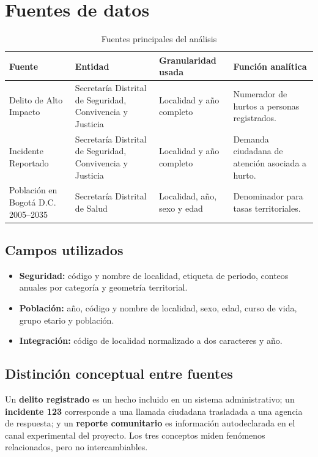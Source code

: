 \documentclass[11pt,letterpaper,oneside]{report}
\begin{document}
\chapter{Fuentes de datos}\label{chap:datos}

\begin{table}[H]
\centering
\caption{Fuentes principales del análisis}\label{tab:sources}
\begin{tabularx}{\textwidth}{L{0.22\textwidth}L{0.18\textwidth}L{0.2\textwidth}Y}
\toprule
\textbf{Fuente} & \textbf{Entidad} & \textbf{Granularidad usada} & \textbf{Función analítica} \\
\midrule
Delito de Alto Impacto & Secretaría Distrital de Seguridad, Convivencia y Justicia & Localidad y año completo & Numerador de hurtos a personas registrados. \\
Incidente Reportado & Secretaría Distrital de Seguridad, Convivencia y Justicia & Localidad y año completo & Demanda ciudadana de atención asociada a hurto. \\
Población en Bogotá D.C. 2005--2035 & Secretaría Distrital de Salud & Localidad, año, sexo y edad & Denominador para tasas territoriales. \\
\bottomrule
\end{tabularx}
\end{table}

\section{Campos utilizados}

\begin{itemize}
  \item \textbf{Seguridad:} código y nombre de localidad, etiqueta de periodo, conteos anuales por categoría y geometría territorial.
  \item \textbf{Población:} año, código y nombre de localidad, sexo, edad, curso de vida, grupo etario y población.
  \item \textbf{Integración:} código de localidad normalizado a dos caracteres y año.
\end{itemize}

\section{Distinción conceptual entre fuentes}

Un \textbf{delito registrado} es un hecho incluido en un sistema administrativo; un \textbf{incidente 123} corresponde a una llamada ciudadana trasladada a una agencia de respuesta; y un \textbf{reporte comunitario} es información autodeclarada en el canal experimental del proyecto. Los tres conceptos miden fenómenos relacionados, pero no intercambiables.
\end{document}
